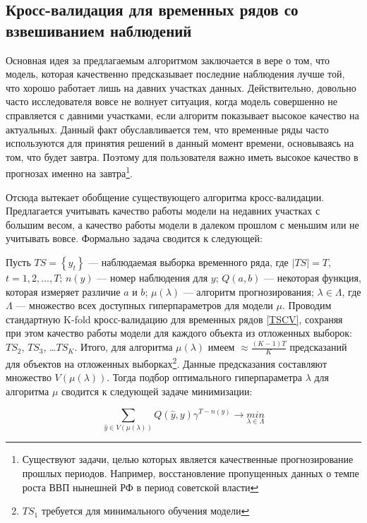 \documentclass[a4paper, 14pt]{article}
\begin{document}
\subsection{Кросс-валидация для временных рядов со взвешиванием наблюдений}

Основная идея за предлагаемым алгоритмом заключается в вере о том, что модель, которая качественно предсказывает последние наблюдения лучше той, что хорошо работает лишь на давних участках данных. Действительно, довольно часто исследователя вовсе не волнует ситуация, когда модель совершенно не справляется с давними участками, если алгоритм показывает высокое качество на актуальных. Данный факт обуславливается тем, что временные ряды часто используются для принятия решений в данный момент времени, основываясь на том, что будет завтра. Поэтому для пользователя важно иметь высокое качество в прогнозах именно на завтра\footnote{Существуют задачи, целью которых является качественные прогнозирование прошлых периодов. Например, восстановление пропущенных данных о темпе роста ВВП нынешней РФ в период советской власти}. 

Отсюда вытекает обобщение существующего алгоритма кросс-валидации. Предлагается учитывать качество работы модели на недавних участках с большим весом, а качество работы модели в далеком прошлом с меньшим или не учитывать вовсе. Формально задача сводится к следующей:

\noindent Пусть $TS = \left\{y_t\right\}$ --- наблюдаемая выборка временного ряда, где $\left|TS\right| = T$, $t = 1, 2, \dots,  T$; $n(y)$ --- номер наблюдения для $y$; $Q(a,b)$ --- некоторая функция, которая измеряет различие $a$ и $b$; $\mu (\lambda)$ --- алгоритм прогнозирования; $\lambda \in \Lambda$, где $\Lambda$ --- множество всех доступных гиперпараметров для модели $\mu$. Проводим стандартную K-fold кросс-валидацию для временных рядов \eqref{TSCV}, сохраняя при этом качество работы модели для каждого объекта из отложенных выборок: $TS_2$, $TS_3$, \dots $TS_K$. Итого, для алгоритма $\mu(\lambda)$ имеем $\approx \frac{(K-1)T}{K}$ предсказаний для объектов на отложенных выборках\footnote{$TS_1$ требуется для минимального обучения модели}. Данные предсказания составляют множество $V(\mu(\lambda))$. Тогда подбор оптимального гиперпараметра $\lambda$ для алгоритма $\mu$ сводится к следующей задаче минимизации:

\begin{equation}
\sum_{\hat y \in V(\mu(\lambda))} Q(\hat y, y) \gamma^{T - n(y)} \rightarrow \underset{\lambda \in \Lambda}{min}
\end{equation}


\newpage
\end{document}
